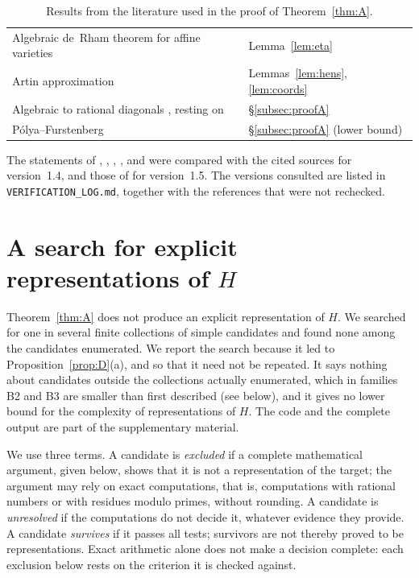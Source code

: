 \documentclass[11pt]{amsart}
\theoremstyle{definition}
\theoremstyle{remark}
\numberwithin{equation}{section}
\begin{document}
\begin{table}[ht]
\begin{tabular}{>{\raggedright\arraybackslash}p{}>{\raggedright\arraybackslash}p{}}
Algebraic de~Rham theorem for affine varieties \citep{Grothendieck1966} & Lemma~\ref{lem:eta}\\
Artin approximation \citep[Thm.~1.10]{Artin1969} & Lemmas~\ref{lem:hens}, \ref{lem:coords}\\
Algebraic to rational diagonals \citep[Lemma~3.2]{HarderKramerMiller2026}, resting on \citep[Thm.~6.2, Rem.~6.4]{DenefLipshitz1987} & \S\ref{subsec:proofA}\\
P\'olya--Furstenberg \citep{Polya1922,Furstenberg1967} & \S\ref{subsec:proofA} (lower bound)\\
\bottomrule
\end{tabular}
\medskip
\caption{Results from the literature used in the proof of Theorem~\ref{thm:A}.}\label{tab:imports}
\end{table}

The statements of \citet{Fedorov2018}, \citet[4.4.3]{Deligne1971}, \citet[Theorem~7.13]{Milne2013}, \citet[Theorem~2.4]{DeligneMumford1969}, \citet[Theorem~1.10]{Artin1969} and \citet[Lemma~3.2]{HarderKramerMiller2026} were compared with the cited sources for version~1.4, and those of \citet[I.2.17, II.4.5, II.5.9, II.6.13, II.6.14, II.7.9]{Deligne1970} for version~1.5. The versions consulted are listed in \texttt{VERIFICATION\_LOG.md}, together with the references that were not rechecked.

\section{A search for explicit representations of \texorpdfstring{$H$}{H}}\label{app:search}

Theorem~\ref{thm:A} does not produce an explicit representation of $H$. We searched for one in several finite collections of simple candidates and found none among the candidates enumerated. We report the search because it led to Proposition~\ref{prop:D}(a), and so that it need not be repeated. It says nothing about candidates outside the collections actually enumerated, which in families B2 and B3 are smaller than first described (see below), and it gives no lower bound for the complexity of representations of $H$. The code and the complete output are part of the supplementary material.

We use three terms. A candidate is \emph{excluded} if a complete mathematical argument, given below, shows that it is not a representation of the target; the argument may rely on exact computations, that is, computations with rational numbers or with residues modulo primes, without rounding. A candidate is \emph{unresolved} if the computations do not decide it, whatever evidence they provide. A candidate \emph{survives} if it passes all tests; survivors are not thereby proved to be representations. Exact arithmetic alone does not make a decision complete: each exclusion below rests on the criterion it is checked against.
\end{document}
